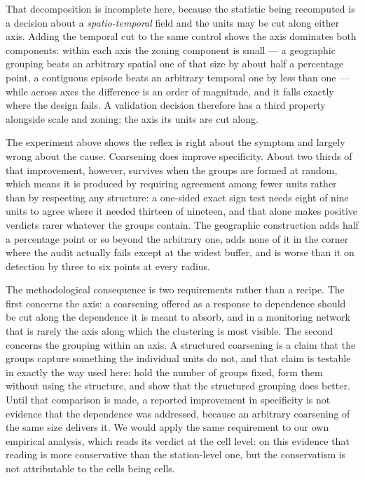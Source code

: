 That decomposition is incomplete here, because the statistic being recomputed is a decision
about a \emph{spatio-temporal} field and the units may be cut along either axis. Adding the
temporal cut to the same control shows the axis dominates both components: within each axis
the zoning component is small --- a geographic grouping beats an arbitrary spatial one of that
size by about half a percentage point, a contiguous episode beats an arbitrary temporal one by
less than one --- while across axes the difference is an order of magnitude, and it falls
exactly where the design fails. A validation decision therefore has a third property alongside
scale and zoning: the axis its units are cut along.

The experiment above shows the reflex is right about the symptom and largely wrong about the cause.
Coarsening does improve specificity. About two thirds of that improvement, however, survives when
the groups are formed at random, which means it is produced by requiring agreement among fewer
units rather than by respecting any structure: a one-sided exact sign test needs eight of nine
units to agree where it needed thirteen of nineteen, and that alone makes positive verdicts rarer
whatever the groups contain. The geographic construction adds half a percentage point or so beyond
the arbitrary one, adds none of it in the corner where the audit actually fails except at the
widest buffer, and is worse than it on detection by three to six points at every radius.

The methodological consequence is two requirements rather than a recipe. The first concerns
the axis: a coarsening offered as a response to dependence should be cut along the dependence
it is meant to absorb, and in a monitoring network that is rarely the axis along which the
clustering is most visible. The second concerns the grouping within an axis. A structured
coarsening is a claim that the groups capture something the individual units do not, and that
claim is testable in exactly the way used here: hold the number of groups fixed, form them
without using the structure, and show that the structured grouping does better. Until that
comparison is made, a reported improvement in specificity is not evidence that the dependence was
addressed, because an arbitrary coarsening of the same size delivers it. We would apply the same
requirement to our own empirical analysis, which reads its verdict at the cell level: on this
evidence that reading is more conservative than the station-level one, but the conservatism is not
attributable to the cells being cells.

